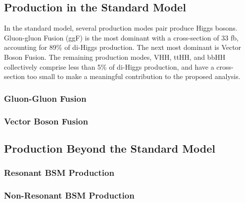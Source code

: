 \subsection{Production in the Standard Model}
In the standard model, several production modes pair produce Higgs bosons. Gluon-gluon Fusion (ggF) is the most dominant with a cross-section of {\color{red} 33} fb, accounting for {\color{red} 89\%} of di-Higgs production. The next most dominant is Vector Boson Fusion. The remaining production modes, VHH, ttHH, and bbHH collectively comprise less than 5\% of di-Higgs production, and have a cross-section too small to make a meaningful contribution to the proposed analysis.

\subsubsection{Gluon-Gluon Fusion}
        \subsubsection{Vector Boson Fusion}
    \subsection{Production Beyond the Standard Model}
        \subsubsection{Resonant BSM Production}
        \subsubsection{Non-Resonant BSM Production}

